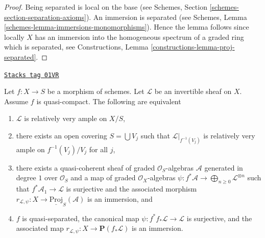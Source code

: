 \begin{proof}
Being separated is local on the base (see
Schemes, Section \ref{schemes-section-separation-axioms}).
An immersion is separated
(see Schemes, Lemma \ref{schemes-lemma-immersions-monomorphisms}).
Hence the lemma follows since locally $X$ has an immersion into
the homogeneous spectrum of a graded ring which is separated, see
Constructions, Lemma \ref{constructions-lemma-proj-separated}.
\end{proof}

\begin{lemma}
\label{morphisms-lemma-relatively-very-ample}
\href{https://stacks.math.columbia.edu/tag/01VR}{\texttt{Stacks tag 01VR}}

Let $f : X \to S$ be a morphism of schemes.
Let $\mathcal{L}$ be an invertible sheaf on $X$.
Assume $f$ is quasi-compact. The following are
equivalent
\begin{enumerate}
\item $\mathcal{L}$ is relatively very ample on $X/S$,
\item there exists an open covering $S = \bigcup V_j$ such
that $\mathcal{L}|_{f^{-1}(V_j)}$ is relatively very ample
on $f^{-1}(V_j)/V_j$ for all $j$,
\item there exists a quasi-coherent sheaf of graded
$\mathcal{O}_S$-algebras $\mathcal{A}$ generated in degree
$1$ over $\mathcal{O}_S$ and a map of graded $\mathcal{O}_X$-algebras
$\psi : f^*\mathcal{A} \to \bigoplus_{n \geq 0} \mathcal{L}^{\otimes n}$
such that $f^*\mathcal{A}_1 \to \mathcal{L}$ is surjective and the
associated morphism
$r_{\mathcal{L}, \psi} : X \to \underline{\text{Proj}}_S(\mathcal{A})$
is an immersion, and
\item $f$ is quasi-separated, the canonical map
$\psi : f^*f_*\mathcal{L} \to \mathcal{L}$ is surjective, and
the associated map $r_{\mathcal{L}, \psi} : X \to \mathbf{P}(f_*\mathcal{L})$
is an immersion.
\end{enumerate}
\end{lemma}

